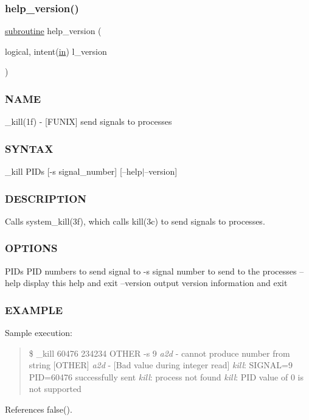 \subsubsection{\texorpdfstring{help\+\_\+version()}{help\_version()}}
{\footnotesize\ttfamily \hyperlink{M__stopwatch_83_8txt_acfbcff50169d691ff02d4a123ed70482}{subroutine} help\+\_\+version (\begin{DoxyParamCaption}\item[{logical, intent(\hyperlink{M__journal_83_8txt_afce72651d1eed785a2132bee863b2f38}{in})}]{l\+\_\+version }\end{DoxyParamCaption})}



\subsubsection*{N\+A\+ME}

\+\_\+kill(1f) -\/ \mbox{[}F\+U\+N\+IX\mbox{]} send signals to processes \subsubsection*{S\+Y\+N\+T\+AX}

\+\_\+kill P\+I\+Ds \mbox{[}-\/s signal\+\_\+number\mbox{]} \mbox{[}--help$\vert$--version\mbox{]} \subsubsection*{D\+E\+S\+C\+R\+I\+P\+T\+I\+ON}

Calls system\+\_\+kill(3f), which calls kill(3c) to send signals to processes. \subsubsection*{O\+P\+T\+I\+O\+NS}

P\+I\+Ds P\+ID numbers to send signal to -\/s signal number to send to the processes --help display this help and exit --version output version information and exit \subsubsection*{E\+X\+A\+M\+P\+LE}

Sample execution\+:

\begin{quote}
\$ \+\_\+kill 60476 234234 O\+T\+H\+ER -\/s 9 {\itshape a2d} -\/ cannot produce number from string \mbox{[}O\+T\+H\+ER\mbox{]} {\itshape a2d} -\/ \mbox{[}Bad value during integer read\mbox{]} {\itshape kill}\+: S\+I\+G\+N\+AL=9 P\+ID=60476 successfully sent {\itshape kill}\+: process not found {\itshape kill}\+: P\+ID value of 0 is not supported \end{quote}


References false().

